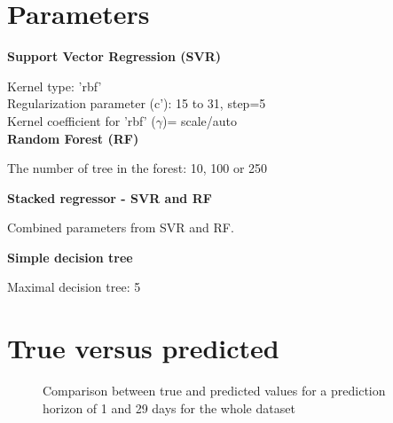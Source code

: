 \section{Parameters}
\noindent
\textbf{Support Vector Regression (SVR)}

\noindent
Kernel type: 'rbf' \\
Regularization parameter (c'): 15 to 31, step=5\\
Kernel coefficient for 'rbf' ($\gamma$)= scale/auto\\

\noindent
\textbf{Random Forest (RF)}

\noindent
The number of tree in the forest: 10, 100 or 250

\noindent
\textbf{Stacked regressor - SVR and RF}

\noindent
Combined parameters from SVR and RF.

\noindent
\textbf{Simple decision tree}

\noindent
Maximal decision tree: 5

\section{True versus predicted}
\label{sec:TrueVersusPredicted}

\begin{figure}[htbp]
  \centering
  
  \caption{Comparison between true and predicted values for a prediction horizon of 1 and 29 days for the whole dataset}
  \label{fig:StackedComparissonFullData}
\end{figure}






